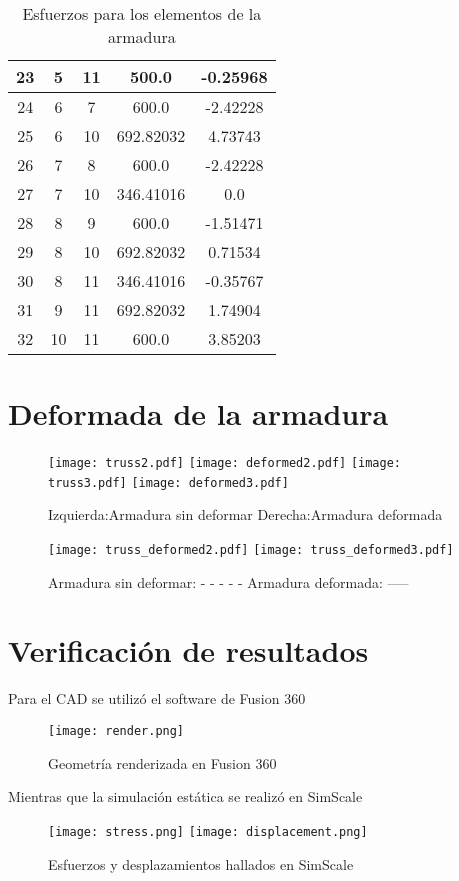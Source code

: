 \documentclass[12pt,a3paper]{article}
\begin{document}
\begin{table}[H]
{\begin{tabular}{c||c|c||c||c}
        \hline
        23 & 5 & 11 & 500.0 & -0.25968 \\
        \hline
        24 & 6 & 7 & 600.0 & -2.42228 \\
        \hline
        25 & 6 & 10 & 692.82032 & 4.73743 \\
        \hline
        26 & 7 & 8 & 600.0 & -2.42228 \\
        \hline
        27 & 7 & 10 & 346.41016 & 0.0 \\
        \hline
        28 & 8 & 9 & 600.0 & -1.51471 \\
        \hline
        29 & 8 & 10 & 692.82032 & 0.71534 \\
        \hline
        30 & 8 & 11 & 346.41016 & -0.35767 \\
        \hline
        31 & 9 & 11 & 692.82032 & 1.74904 \\
        \hline
        32 & 10 & 11 & 600.0 & 3.85203

    \end{tabular}}
    \caption{Esfuerzos para los elementos de la armadura}
\end{table}
\section{Deformada de la armadura}
\begin{figure}[H]
    \centering
    \texttt{[image: truss2.pdf]}
    \texttt{[image: deformed2.pdf]}
    \texttt{[image: truss3.pdf]}
    \texttt{[image: deformed3.pdf]}
    \caption{Izquierda:Armadura sin deformar\hspace{120pt} Derecha:Armadura deformada}
\end{figure}
\begin{figure}[H]
    \centering
    \texttt{[image: truss\_deformed2.pdf]}
    \texttt{[image: truss\_deformed3.pdf]}
    \caption{Armadura sin deformar: {\color{red} - - - - -} \hspace{40pt}Armadura deformada: -----}
\end{figure}
\section{Verificación de resultados}
Para el CAD se utilizó el software de Fusion 360
\begin{figure}[H]
    \centering
    \texttt{[image: render.png]}
    \caption{Geometría renderizada en Fusion 360}
\end{figure}
Mientras que la simulación estática se realizó en SimScale
\begin{figure}[H]
    \centering
    \texttt{[image: stress.png]}
    \texttt{[image: displacement.png]}
    \caption{Esfuerzos y desplazamientos hallados en SimScale}
\end{figure}
\end{document}
